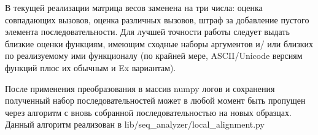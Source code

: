 В текущей реализации матрица весов заменена на три числа: оценка совпадающих вызовов, оценка различных вызовов, штраф за добавление пустого элемента последовательности. Для лучшей точности работы следует выдать близкие оценки функциям, имеющим сходные наборы аргументов и/ или близких по реализуемому ими функционалу (по крайней мере, ASCII/Unicode версиям функций плюс их обычным и Ex вариантам).

После применения преобразования в массив numpy логов и сохранения полученный набор последовательностей может в любой момент быть пропущен через алгоритм с вновь собранной последовательностью на новых образцах.
Данный алгоритм реализован в lib/seq\_analyzer/local\_alignment.py

